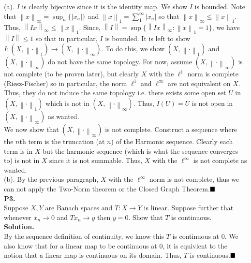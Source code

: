 \documentclass{article}
\newcommand{\norm}[1]{\left\lVert#1\right\rVert}
\begin{document}
    (a). $I$ is clearly bijective since it is the identity map. We show $I$ is bounded. Note that $\norm{x}_{\infty} = \sup_n\{|x_n|\}$ and
    $\norm{x}_1 = \sum_1^{\infty} |x_n|$ so that $\norm{x}_{\infty} \leq \norm{x}_1$. Thus, $\norm{Ix}_{\infty} \leq \norm{x}_1$. Since,
    $\norm{I} = \sup\{\norm{Ix}_{\infty}: \norm{x}_1 = 1\}$, we have $\norm{I} \leq 1$ so that in particular, $I$ is bounded. It is left to show
    $I: (X,\norm{\cdot}_1)\to (X,\norm{\cdot}_{\infty})$. To do this, we show $(X,\norm{\cdot}_1)$ and $(X,\norm{\cdot}_{\infty})$ do not have the same
    topology. For now, assume $(X,\norm{\cdot}_{\infty})$ is not complete (to be proven later), but clearly $X$ with the $\ell^1$ norm is complete (Riesz-Fischer)
    so in particular, the norm $\ell^1$ and $\ell^{\infty}$ are not equivalent on $X$. Thus, they do not induce the same topology i.e. there exists some open set $U$
    in $(X,\norm{\cdot}_1)$ which is not in $(X,\norm{\cdot}_{\infty})$. Thus, $I(U) = U$ is not open in $(X,\norm{\cdot}_{\infty})$ as wanted.\\

    We now show that $(X,\norm{\cdot}_{\infty})$ is not complete. Construct a sequence where the $n$th term is the truncation (at $n$) of the Harmonic sequence.
    Clearly each term is in $X$ but the harmonic sequence (which is what the sequence converges to) is not in $X$ since it is not summable. Thus, $X$ with the $\ell^{\infty}$
    is not complete as wanted.\\

    (b). By the previous paragraph, $X$ with the $\ell^{\infty}$ norm is not complete, thus we can not apply the Two-Norm theorem or the Closed Graph
    Theorem.$\hfill\blacksquare$\\

    \newpage
    \textbf{P3.}\\

    Suppose $X,Y$ are Banach spaces and $T:X\to Y$ is linear. Suppose further that whenever $x_n\to 0$ and $Tx_n\to y$ then $y=0$. Show that $T$ is continuous.\\

    \textbf{Solution.}\\

    By the sequence definition of continuity, we know this $T$ is continuous at 0. We also know that for a linear map to be continuous at 0, it is equivlent to the notion
    that a linear map is continuous on its domain. Thus, $T$ is continuous.$\hfill\blacksquare$\\
\end{document}
